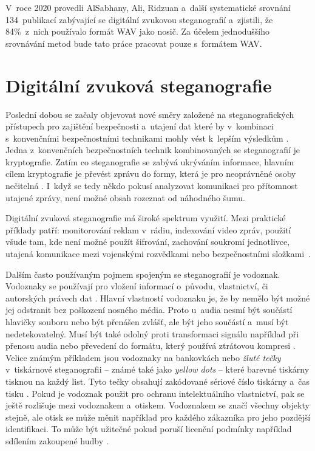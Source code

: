 V~roce 2020 provedli AlSabhany, Ali, Ridzuan a~další \cite{AlSabhany2020}
systematické srovnání 134~publikací zabývající se digitální zvukovou
steganografií a~zjistili, že 84\%~z~nich používalo formát WAV jako nosič. Za
účelem jednoduššího srovnávání metod bude tato práce pracovat pouze s~formátem
WAV.

\section{Digitální zvuková steganografie}
\label{sec:digital-audio-steganography}

Poslední dobou se začaly objevovat nové směry založené na steganografických
přístupech pro zajištění bezpečnosti a~utajení dat které by v~kombinaci
s~konvenčními bezpečnostními technikami mohly vést k~lepším výsledkům
\cite{Djebbar2012}. Jedna z~konvenčních bezpečnostních technik kombinovaných se
steganografií je kryptografie. Zatím co steganografie se zabývá ukrýváním
informace, hlavním cílem kryptografie je převést zprávu do formy, která je pro
neoprávněné osoby nečitelná \cite{AlSabhany2020}. I~když se tedy někdo pokusí
analyzovat komunikaci pro přítomnost utajené zprávy, není možné obsah rozeznat
od náhodného šumu.

Digitální zvuková steganografie má široké spektrum využití. Mezi praktické příklady patří:
monitorování reklam v~rádiu, indexování video zpráv, použití všude tam, kde
není možné použít šifrování, zachování soukromí jednotlivce, utajená komunikace
mezi vojenskými rozvědkami nebo bezpečnostními složkami~\cite{Dutta2020}.

Dalším často používaným pojmem spojeným se steganografií je vodoznak. Vodoznaky
se používají pro vložení informací o~původu, vlastnictví, či autorských právech
dat \cite{Djebbar2012}\cite{Dutta2020}\cite{Swanson1998}. Hlavní vlastností
vodoznaku je, že by nemělo být možné jej odstranit bez poškození nosného média.
Proto u~audia nesmí být součástí hlavičky souboru nebo být přenášen zvlášť, ale
být jeho součástí a~musí být nedetekovatelný. Musí být také odolný proti
transformaci signálu například při přenosu audia nebo převedení do formátu,
který používá ztrátovou kompresi \cite{Swanson1998}. Velice známým příkladem
jsou vodoznaky na bankovkách nebo \textit{žluté tečky} v~tiskárnové
steganografii -- známé také jako \textit{yellow dots} -- které barevné tiskárny
tisknou na každý list. Tyto tečky obsahují zakódované sériové číslo tiskárny
a~čas tisku \cite{Dutta2020}. Pokud je vodoznak použit pro ochranu
intelektuálního vlastnictví, pak se ještě rozlišuje mezi vodoznakem a~otiskem.
Vodoznakem se značí všechny objekty stejně, ale otisk se může měnit například
pro každého zákazníka pro jeho pozdější identifikaci. To může být užitečné
pokud poruší licenční podmínky například sdílením zakoupené hudby
\cite{Swanson1998}.

